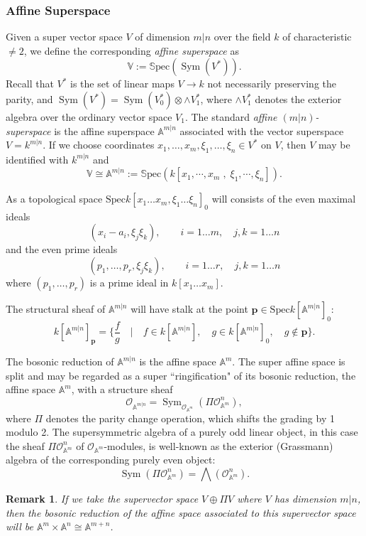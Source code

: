 \documentclass[12pt, reqno]{amsart}
\theoremstyle{plain}
\newtheorem{remark}[theorem]{Remark}
\numberwithin{equation}{section}
\def \ra{\rightarrow}
\newcommand{\Sym}{\operatorname{Sym}\nolimits}
\newcommand\spec{{\mathrm{Spec}}}
\newcommand{\bp} {\mathbf {p}}
\newcommand{\bA} {\mathbb{A}}
\newcommand{\mc}[1]{\mathcal{#1}}
\newcommand{\Spec}[1]{\mathbb{S}\mathrm{pec}(#1)}
\begin{document}
\subsubsection{Affine Superspace}
Given a super vector space $V$ of dimension $m|n$ over the 
field $k$ of characteristic $\neq 2$, we define the corresponding \emph{affine superspace} as
\[
\mathbb{V} := \Spec{ \Sym (V^*)}.
\]
Recall that
$V^*$ is the set of linear maps $V \ra k$ not necessarily preserving
the parity, and $\Sym(V^*)=\Sym(V^*_0) \otimes \wedge V^*_1$,
where $\wedge V^*_1$ denotes the exterior algebra over the
ordinary vector space $V_1$. 
The standard \emph{affine $(m|n)$-superspace} is the affine 
superspace $\mathbb{A}^{m|n}$ associated with the vector 
superspace $V = k^{m|n}$. If we choose coordinates $x_1, \dots, 
x_m, \xi_1, \dots, \xi_n \in V^*$ on $V$, then $V$ may be 
identified with $k^{m|n}$ and
\[ \mathbb{V} \cong \mathbb{A}^{m|n} := \Spec{k[x_1, \cdots, x_m \; 
, \;  \xi_1, \cdots, \xi_n]}. \]

As a topological space
$\spec k[x_1 \dots x_m, \xi_1 \dots \xi_n]_0$ will consists of
the even maximal ideals
$$
(x_i-a_i, \xi_j\xi_k),
\qquad i=1 \dots m, \quad j,k=1 \dots n
$$
and the even prime ideals
$$
(p_1, \dots, p_r, \xi_j\xi_k),
\qquad i=1 \dots r, \quad j,k=1 \dots n
$$
where $(p_1, \dots, p_r)$ is a prime ideal in $k[x_1 \dots x_m]$.


The structural sheaf of $\bA^{m|n}$ will have stalk at the
point $\bp \in \spec k[\bA^{m|n}]_0$:
$$
k[\bA^{m|n}]_{\bp}=\{{\frac{f}{g}} \quad | \quad  f \in k[\bA^{m|n}],\quad
g\in k[\bA^{m|n}]_0, \quad  g\notin \bp\}.
$$

The bosonic reduction of $\mathbb{A}^{m|n}$ is the affine space $
\mathbb{A}^m$. The super affine space is split and may be regarded 
as a super ``ringification" of its bosonic reduction, the affine 
space $\mathbb{A}^m$, with a structure sheaf 
\[ \mc{O}_{\mathbb{A}^{m|n}} = \Sym_{\mc{O}_{\mathbb{A}^m}} (\Pi 
\mc{O}_{\mathbb{A}^m}^n),
\]
where $\Pi$ denotes the parity change operation, which shifts the 
grading by 1 modulo 2. The supersymmetric algebra of a purely odd 
linear object, in this case the sheaf 
$\Pi \mc{O}_{\mathbb{A}^m}^n$ of $\mc{O}_{\mathbb{A}^m}$-modules, 
is well-known as the exterior (Grassmann) algebra of the 
corresponding purely even object:
\[
\Sym (\Pi \mc{O}_{\mathbb{A}^m}^n) = 
\bigwedge(\mc{O}_{\mathbb{A}^m}^n).
\]

\begin{remark}
    If we take the supervector space $V \oplus \Pi V$ where $V$ has dimension $m|n$, then the bosonic reduction of the affine space associated to this supervector space will be $\mathbb{A}^m \times \mathbb{A}^n \cong \mathbb{A}^{m+n}$.
\end{remark}
\end{document}
